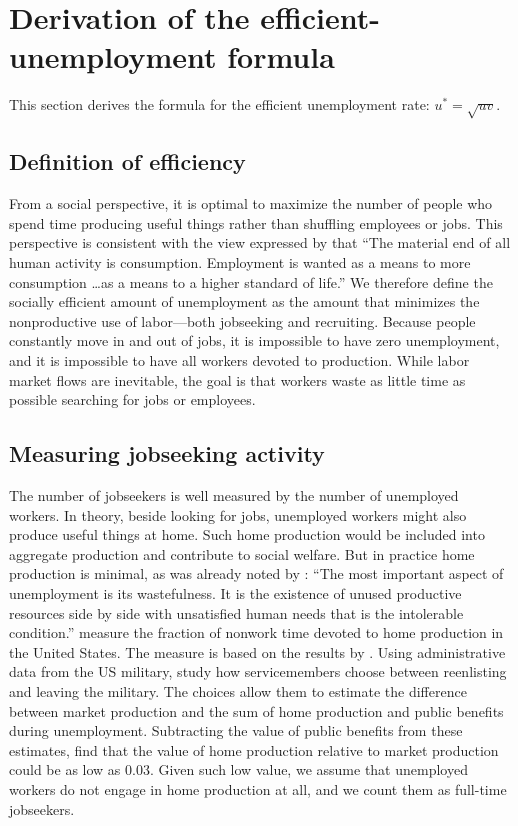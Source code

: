 \documentclass[letterpaper,12pt,leqno]{article}
\begin{document}
\section{Derivation of the efficient-unemployment formula}\label{s:formula}

This section derives the formula for the efficient unemployment rate: $u^* = \sqrt{uv}$.

\subsection{Definition of efficiency}

From a social perspective, it is optimal to maximize the number of people who spend time producing useful things rather than shuffling employees or jobs. This perspective is consistent with the view expressed by \citet[p. 20]{B44} that ``The material end of all human activity is consumption. Employment is wanted as a means to more consumption \dots as a means to a higher standard of life.'' We therefore define the socially efficient amount of unemployment as the amount that minimizes the nonproductive use of labor---both jobseeking and recruiting. Because people constantly move in and out of jobs, it is impossible to have zero unemployment, and it is impossible to have all workers devoted to production. While labor market flows are inevitable, the goal is that workers waste as little time as possible searching for jobs or employees. 

\subsection{Measuring jobseeking activity}

The number of jobseekers is well measured by the number of unemployed workers. In theory, beside looking for jobs, unemployed workers might also produce useful things at home. Such home production would be included into aggregate production and contribute to social welfare. But in practice home production is minimal, as was already noted by \citet[p. 11]{R49}: ``The most important aspect of unemployment is its wastefulness. It is the existence of unused productive resources side by side with unsatisfied human needs that is the intolerable condition.'' \citet[pp. 9--11]{MS16} measure the fraction of nonwork time devoted to home production in the United States. The measure is based on the results by \citet{BM15}. Using administrative data from the US military, \citeauthor{BM15} study how servicemembers choose between reenlisting and leaving the military. The choices allow them to estimate the difference between market production and the sum of home production and public benefits during unemployment. Subtracting the value of public benefits from these estimates, \citet[p. 11]{MS16} find that the value of home production relative to market production could be as low as $0.03$. Given such low value, we assume that unemployed workers do not engage in home production at all, and we count them as full-time jobseekers.
\end{document}
